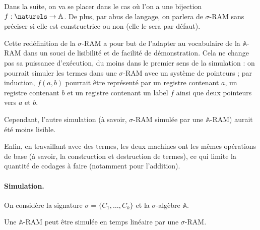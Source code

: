 \documentclass{report}
\newcommand{\bbA}{\mathbb{A}}
\begin{document}
				
				\label{text:bijection_f}
				Dans la suite, on va se placer dans le cas où l'on a une bijection $f : \naturels \to \bbA$.
				De plus, par abus de langage, on parlera de $\sigma$-RAM sans préciser si elle est constructrice ou non (elle le sera par défaut). 

				\begin{remark}
					\label{rk:ajouts_naturels}
					Cette redéfinition de la $\sigma$-RAM a pour but de l'adapter au vocabulaire de la $\bbA$-RAM dans un souci de lisibilité et de facilité de démonstration. Cela ne change pas sa puissance d'exécution, du moins dans le premier sens de la simulation : on pourrait simuler les termes dans une $\sigma$-RAM avec un système de pointeurs ; par induction, $f(a,b)$ pourrait être représenté par un registre contenant $a$, un registre contenant $b$ et un registre contenant un label $f$ ainsi que deux pointeurs vers $a$ et $b$. 
					
					Cependant, l'autre simulation (à savoir, $\sigma$-RAM simulée par une $\bbA$-RAM) aurait été moins lisible. 
					
					Enfin, en travaillant avec des termes, les deux machines ont les mêmes opérations de base (à savoir, la construction et destruction de termes), ce qui limite la quantité de codages à faire (notamment pour l'addition).
				\end{remark}
				
				\paragraph{Simulation.}
				\label{par:sim_A_RAM_sigma_RAM}
				On considère la signature $\sigma = \{C_1, \dots, C_k\}$ et la $\sigma$-algèbre $\bbA$.
				
				\begin{lemma}
					\label{lem:sim_A_RAM_sigma_RAM}
					Une $\bbA$-RAM peut être simulée en temps linéaire par une $\sigma$-RAM.
				\end{lemma}
				
\end{document}
